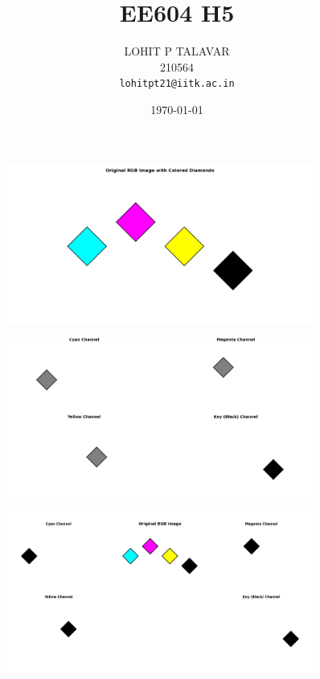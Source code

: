 \documentclass{article}
\title{EE604 H5}
\author{LOHIT P TALAVAR \\ 210564 \\ \texttt{lohitpt21@iitk.ac.in}}
\date{\today}
\begin{document}
\maketitle

\begin{figure}[htp]
  \centering
  \includegraphics[width=0.9\textwidth]{Figure_1.png}
  \vspace{6pt}
\end{figure}

\begin{figure}[htp]
  \centering
  \includegraphics[width=0.9\textwidth]{Figure_2.png}
  \vspace{6pt}
\end{figure}

\begin{figure}[htp]
  \centering
  \includegraphics[width=0.9\textwidth]{Figure_3.png}
  \vspace{6pt}
\end{figure}
\end{document}
